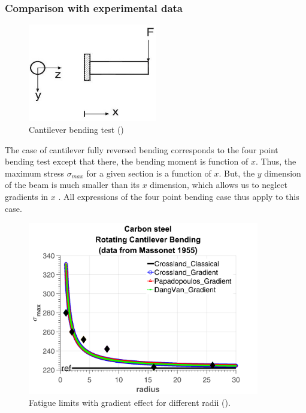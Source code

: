 \subsubsection{Comparison with experimental data}
\begin{figure}[!h]
	\begin{center}
		\includegraphics[width=0.5\textwidth]{figures//fig3.jpg} 
		\caption{Cantilever bending test (\cite{Papadopoulos1996513})}
		\label{fig9}
	\end{center}
\end{figure}
The case of cantilever fully reversed bending corresponds to the four point bending test except that there, the bending moment is function of $x$. Thus, the maximum stress $\sigma_{max}$ for a given section is a function of $x$. But, the $y$ dimension of the beam is much smaller than its $x$ dimension, which allows us to neglect gradients in $x$ . All  expressions of the four point bending case thus  apply to this case. 

\newpage
\begin{figure}[!h]
	\begin{center}
		\includegraphics[width=0.9\textwidth]{figures//carbonsteel.png} 
		\caption{Fatigue limits with gradient effect for different radii (\cite{Massonnet1955}).}
		\label{fig.gradientcalibration1}
	\end{center}
\end{figure}

